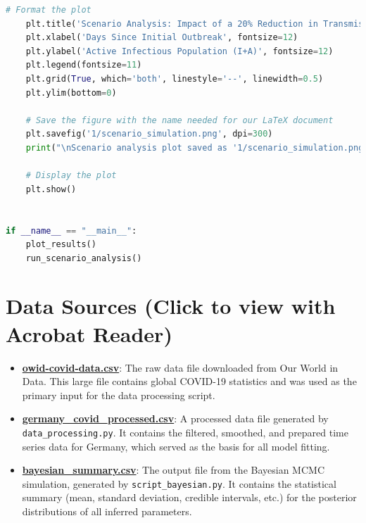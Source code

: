 \documentclass[12pt, a4paper]{article}
\begin{document}
\begin{lstlisting}[language=Python, caption=Python script for plotting the Bayesian model fit and running the scenario analysis.]
    # Format the plot
    plt.title('Scenario Analysis: Impact of a 20% Reduction in Transmission Rate', fontsize=16)
    plt.xlabel('Days Since Initial Outbreak', fontsize=12)
    plt.ylabel('Active Infectious Population (I+A)', fontsize=12)
    plt.legend(fontsize=11)
    plt.grid(True, which='both', linestyle='--', linewidth=0.5)
    plt.ylim(bottom=0)

    # Save the figure with the name needed for our LaTeX document
    plt.savefig('1/scenario_simulation.png', dpi=300)
    print("\nScenario analysis plot saved as '1/scenario_simulation.png'")

    # Display the plot
    plt.show()


if __name__ == "__main__":
    plot_results()
    run_scenario_analysis() 
\end{lstlisting}

\section{Data Sources (Click to view with Acrobat Reader)}
\begin{itemize}
    \item \href{run:owid-covid-data.csv}{\textbf{owid-covid-data.csv}}: The raw data file downloaded from Our World in Data. This large file contains global COVID-19 statistics and was used as the primary input for the data processing script.
    \item \href{run:germany_covid_processed.csv}{\textbf{germany\_covid\_processed.csv}}: A processed data file generated by \texttt{data\_processing.py}. It contains the filtered, smoothed, and prepared time series data for Germany, which served as the basis for all model fitting.
    \item \href{run:bayesian_summary.csv}{\textbf{bayesian\_summary.csv}}: The output file from the Bayesian MCMC simulation, generated by \texttt{script\_bayesian.py}. It contains the statistical summary (mean, standard deviation, credible intervals, etc.) for the posterior distributions of all inferred parameters.
\end{itemize}
\end{document}
